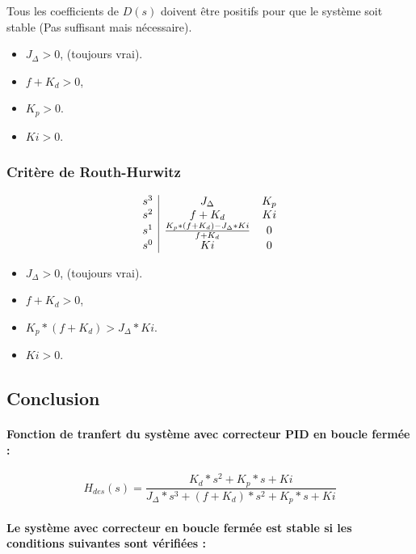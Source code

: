 Tous les coefficients de $D(s)$ doivent être positifs pour que le système soit stable (Pas suffisant mais nécessaire).

\begin{itemize}
	\item $J_\Delta > 0$, (toujours vrai).
	\item $f + K_d > 0$, 
	\item $K_p > 0$.
	\item $Ki > 0$.
\end{itemize}

\subsubsection{Critère de Routh-Hurwitz}

\begin{equation}
	\begin{array}{c|c c}
		s^3 & J_\Delta & K_p \\
		s^2 & f + K_d & Ki \\
		s^1 & \frac{K_p * (f + K_d) - J_\Delta * Ki}{f + K_d} & 0 \\
		s^0 & Ki & 0
	\end{array}
\end{equation}

\begin{itemize}
	\item $J_\Delta > 0$, (toujours vrai).
	\item $f + K_d > 0$, 
	\item $K_p * (f + K_d) > J_\Delta * Ki$.
	\item $Ki > 0$.
\end{itemize}

\newpage

\subsection{Conclusion}

\paragraph{Fonction de tranfert du système avec correcteur PID en boucle fermée :}

\begin{equation}
	H_{des}(s) = \frac{K_d * s^2 + K_p * s + Ki}{J_\Delta * s^3 + (f + K_d) * s^2 + K_p * s + Ki}
\end{equation}

\paragraph{Le système avec correcteur en boucle fermée est stable si les conditions suivantes sont vérifiées :}

